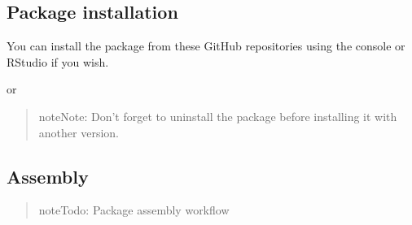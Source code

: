 \documentclass[a4paper,12pt,english]{sphinxhowto}
\begin{document}
\subsection{Package installation}
\label{\detokenize{sdam:package-installation}}\label{\detokenize{sdam:sdam-inst}}
You can install the  package from these GitHub repositories using  the  console
or RStudio if you wish.

\begin{sphinxVerbatim}[commandchars=\\\{\},formatcom=\footnotesize]
  
\end{sphinxVerbatim}

or

\begin{sphinxVerbatim}[commandchars=\\\{\},formatcom=\footnotesize]
 
\end{sphinxVerbatim}

\begin{quote}

\begin{sphinxadmonition}{note}{Note:}
Don’t forget to uninstall the package before installing it with another version.
\end{sphinxadmonition}
\end{quote}



\subsection{Assembly}
\label{\detokenize{sdam:assembly}}\begin{quote}

\begin{sphinxadmonition}{note}{\label{\detokenize{sdam:id4}}Todo:}
Package assembly workflow
\end{sphinxadmonition}
\end{quote}
\end{document}
